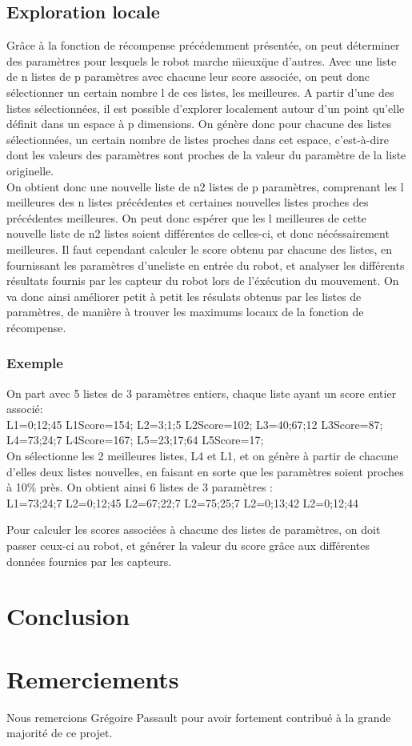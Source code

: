 \documentclass[11pt]{article}
\begin{document}
\subsection{Exploration locale}
Grâce à la fonction de récompense précédemment présentée, on peut déterminer des paramètres pour lesquels le robot marche \"mieux\" que d'autres. Avec une liste de n listes de p paramètres avec chacune leur score associée, on peut donc sélectionner un certain nombre l de ces listes, les meilleures. A partir d'une des listes sélectionnées, il est possible d'explorer localement autour d'un point qu'elle définit dans un espace à p dimensions. On génère donc pour chacune des listes sélectionnées, un certain nombre de listes proches dans cet espace, c'est-à-dire dont les valeurs des paramètres sont proches de la valeur du paramètre de la liste originelle.\\
On obtient donc une nouvelle liste de n2 listes de p paramètres, comprenant les l meilleures des n listes précédentes et certaines nouvelles listes proches des précédentes meilleures. On peut donc espérer que les l meilleures de cette nouvelle liste de n2 listes soient différentes de celles-ci, et donc nécéssairement meilleures. Il faut cependant calculer le score obtenu par chacune des listes, en fournissant les paramètres d'uneliste en entrée du robot, et analyser les différents résultats fournis par les capteur du robot lors de l'éxécution du mouvement. On va donc ainsi améliorer petit à petit les résulats obtenus par les listes de paramètres, de manière à trouver les maximums locaux de la fonction de récompense.\\

\subsubsection{Exemple} 
On part avec 5 listes de 3 paramètres entiers, chaque liste ayant un score entier associé:\\
L1={0;12;45}
L1Score=154;
L2={3;1;5}
L2Score=102;
L3={40;67;12}
L3Score=87;
L4={73;24;7}
L4Score=167;
L5={23;17;64}
L5Score=17;\\

On sélectionne les 2 meilleures listes, L4 et L1, et on génère à partir de chacune d'elles deux listes nouvelles, en faisant en sorte que les paramètres soient proches à 10\% près. On obtient ainsi 6 listes de 3 paramètres :\\

L1={73;24;7}
L2={0;12;45}
L2={67;22;7}
L2={75;25;7}
L2={0;13;42}
L2={0;12;44}

Pour calculer les scores associées à chacune des listes de paramètres, on doit passer ceux-ci au robot, et générer la valeur du score grâce aux différentes données fournies par les capteurs.

\section{Conclusion}

\section{Remerciements}
Nous remercions Grégoire Passault pour avoir fortement contribué à la grande majorité de ce projet.
\end{document}
